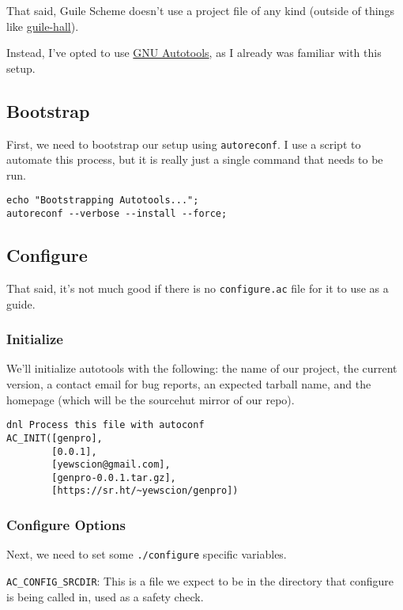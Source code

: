 \documentclass[11pt]{article}
\begin{document}
That said, Guile Scheme doesn't use a project file of any kind (outside of
things like \href{https://gitlab.com/a-sassmannshausen/guile-hall}{guile-hall}).

Instead, I've opted to use \href{https://www.gnu.org/software/automake/faq/autotools-faq.html}{GNU Autotools}, as I already was familiar with this
setup.

\subsection{Bootstrap}
\label{sec:org1effe1f}
First, we need to bootstrap our setup using \texttt{autoreconf}. I use a script to
automate this process, but it is really just a single command that needs to be
run.

\begin{verbatim}
echo "Bootstrapping Autotools...";
autoreconf --verbose --install --force;
\end{verbatim}

\subsection{Configure}
\label{sec:org7a42f4b}
That said, it's not much good if there is no \texttt{configure.ac} file for it to use
as a guide.

\subsubsection{Initialize}
\label{sec:orgcfbc274}

We'll initialize autotools with the following: the name of our project, the
current version, a contact email for bug reports, an expected tarball name, and
the homepage (which will be the sourcehut mirror of our repo).

\begin{verbatim}
dnl Process this file with autoconf
AC_INIT([genpro],
        [0.0.1],
        [yewscion@gmail.com],
        [genpro-0.0.1.tar.gz],
        [https://sr.ht/~yewscion/genpro])
\end{verbatim}

\subsubsection{Configure Options}
\label{sec:org7b0014d}
Next, we need to set some \texttt{./configure} specific variables.

\texttt{AC\_CONFIG\_SRCDIR}: This is a file we expect to be in the directory that
configure is being called in, used as a safety check.
\end{document}
